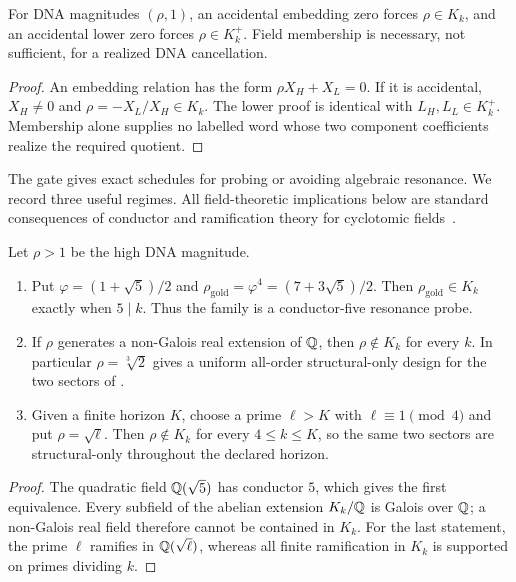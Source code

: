 \begin{corollary}
\label{cor:dna-field-gate}
For DNA magnitudes $(\rho,1)$, an accidental embedding zero forces
$\rho\in K_k$, and an accidental lower zero forces $\rho\in K_k^+$.
Field membership is necessary, not sufficient, for a realized DNA
cancellation.
\end{corollary}

\begin{proof}
An embedding relation has the form $\rho X_H+X_L=0$.  If it is accidental,
$X_H\ne0$ and $\rho=-X_L/X_H\in K_k$.  The lower proof is identical with
$L_H,L_L\in K_k^+$.  Membership alone supplies no labelled word whose two
component coefficients realize the required quotient.
\end{proof}

The gate gives exact schedules for probing or avoiding algebraic resonance.
We record three useful regimes.  All field-theoretic implications below are
standard consequences of conductor and ramification theory for cyclotomic
fields~\cite{Washington1997}.

\begin{corollary}
\label{cor:weight-designs}
Let $\rho>1$ be the high DNA magnitude.
\begin{enumerate}
  \item Put $\varphi=(1+\sqrt5)/2$ and
  $\rho_{\mathrm{gold}}=\varphi^4=(7+3\sqrt5)/2$.  Then
  $\rho_{\mathrm{gold}}\in K_k$ exactly when $5\mid k$.  Thus the family is
  a conductor-five resonance probe.
  \item If $\rho$ generates a non-Galois real extension of $\mathbb Q$, then
  $\rho\notin K_k$ for every $k$.  In particular $\rho=\sqrt[3]{2}$ gives a
  uniform all-order structural-only design for the two sectors of
  .
  \item Given a finite horizon $K$, choose a prime $\ell>K$ with
  $\ell\equiv1\pmod4$ and put $\rho=\sqrt\ell$.  Then
  $\rho\notin K_k$ for every $4\le k\le K$, so the same two sectors are
  structural-only throughout the declared horizon.
\end{enumerate}
\end{corollary}

\begin{proof}
The quadratic field $\mathbb Q(\sqrt5)$ has conductor $5$, which gives the first
equivalence.  Every subfield of the abelian extension $K_k/\mathbb Q$ is Galois over
$\mathbb Q$; a non-Galois real field therefore cannot be contained in $K_k$.  For
the last statement, the prime $\ell$ ramifies in $\mathbb Q(\sqrt\ell)$, whereas all
finite ramification in $K_k$ is supported on primes dividing $k$.
\end{proof}


